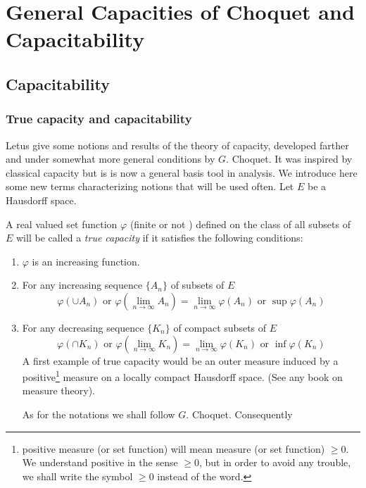 \part{General Capacities of Choquet and Capacitability}\label{p2} %

\chapter{Capacitability}\label{p2:chap1}

\section{True capacity and capacitability}\label{p2:chap1:sec1}

Let\pageoriginale us give some notions and results of the theory of capacity,
developed farther and under somewhat more general conditions by
$G$. Choquet. It was inspired by classical capacity but is is now a
general basis tool in analysis. We introduce here some new terms
characterizing notions that will be used often. Let $E$ be a Hausdorff
space. 

\begin{defn} \label{p2:chap1:sec1:def1} %
  A real valued set function $\varphi$ (finite or not ) defined on the
  class of all subsets of $E$ will be called a \textit{ true capacity
  } if it satisfies the following conditions: 
  \begin{enumerate}[\rm(i)]
  \item $\varphi$ is an increasing function.
  \item For any increasing sequence $\{ A_n \}$ of subsets of $E$ 
    $$
    \varphi(\cup A_n) \text{ or } \varphi(\lim_{n \to \infty} A_n)
    =\lim_{n \to \infty} \varphi (A_n) \text{ or } \sup \varphi(A_n) 
    $$
  \item For any decreasing sequence $\{K_n \}$ of compact subsets of $E$ 
    $$
    \varphi(\cap K_n) \text{ or } \varphi(\lim_{n \to \infty} K_n)
    =\lim_{n \to \infty} \varphi (K_n) \text{ or } \inf \varphi(K_n) 
    $$
    A first example of true capacity would be an outer measure induced
    by a positive\footnote{positive measure (or set function) will
      mean measure (or set function) $\geq 0$. We understand positive
      in the sense $\geq 0$, but in order to avoid any trouble, we
      shall write the symbol $\geq 0$ instead of the word.} measure on
    a locally compact Hausdorff space. (See any book on measure
    theory). 
    
    As for the notations we shall follow $G$. Choquet. Consequently 
  \end{enumerate}
\end{defn}

